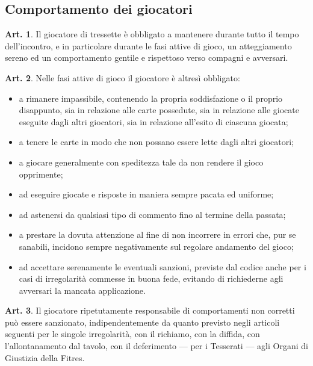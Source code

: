 \documentclass[italian,a4paper]{book}
\theoremstyle{definition}
\newtheorem{art}{Art.}
\newenvironment{packeditem}{
\begin{itemize}
  \setlength{\itemsep}{1pt}
  \setlength{\parskip}{0pt}
  \setlength{\parsep}{0pt}
}{\end{itemize}}
\begin{document}
\subsection{Comportamento dei giocatori}
\begin{art}
    Il giocatore di tressette è obbligato a mantenere durante tutto il tempo dell'incontro, e in particolare durante le fasi attive di gioco, un atteggiamento sereno ed un comportamento gentile e rispettoso verso compagni e avversari.
\end{art}
\begin{art}
    Nelle fasi attive di gioco il giocatore è altresì obbligato:
    \begin{packeditem}
\item      a rimanere impassibile, contenendo la propria soddisfazione o il proprio disappunto, sia in relazione alle carte possedute, sia in relazione alle giocate eseguite dagli altri giocatori, sia in relazione all'esito di ciascuna giocata;
\item      a tenere le carte in modo che non possano essere lette dagli altri giocatori;
\item      a giocare generalmente con speditezza tale da non rendere il gioco opprimente;
\item      ad eseguire giocate e risposte in maniera sempre pacata ed uniforme;
\item      ad astenersi da qualsiasi tipo di commento fino al termine della passata;
\item       a prestare la dovuta attenzione al fine di non incorrere in errori che, pur se sanabili, incidono sempre negativamente sul regolare andamento del gioco;
\item      ad accettare serenamente le eventuali sanzioni, previste dal codice anche per i casi di irregolarità commesse in buona fede, evitando di richiederne agli avversari la mancata applicazione.
    \end{packeditem}
\end{art}
\begin{art}
    Il giocatore ripetutamente responsabile di comportamenti non corretti può
    essere sanzionato, indipendentemente da quanto previsto negli articoli
    seguenti per le singole irregolarità, con il richiamo, con la diffida, con
    l'allontanamento dal tavolo, con il deferimento --- per i Tesserati --- agli Organi di Giustizia della Fitres.
\end{art}
\end{document}
